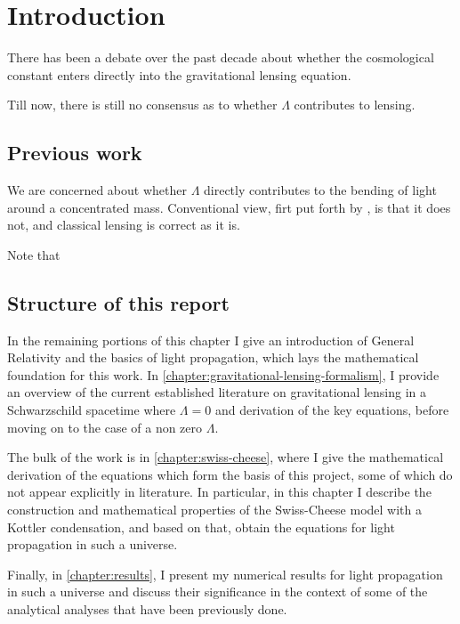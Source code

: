 \chapter{Introduction}

There has been a debate over the past decade about whether the cosmological constant enters directly into the gravitational lensing equation. 

Till now, there is still no consensus as to whether $\Lambda$ contributes to lensing. 

\section{Previous work}

We are concerned about whether $\Lambda$ directly contributes to the bending of light around a concentrated mass. Conventional view, firt put forth by \citet{islam1983cosmological}, is that it does not, and classical lensing is correct as it is. 

Note that 



\section{Structure of this report}
In the remaining portions of this chapter I give an introduction of General Relativity and the basics of light propagation, which lays the mathematical foundation for this work. In \autoref{chapter:gravitational-lensing-formalism}, I provide an overview of the current established literature on gravitational lensing in a Schwarzschild spacetime where $\Lambda = 0$ and derivation of the key equations, before moving on to the case of a non zero $\Lambda$. 

The bulk of the work is in \autoref{chapter:swiss-cheese}, where I give the mathematical derivation of the equations which form the basis of this project, some of which do not appear explicitly in literature. In particular, in this chapter I describe the construction and mathematical properties of the Swiss-Cheese model with a Kottler condensation, and based on that, obtain the equations for light propagation in such a universe. 

Finally, in \autoref{chapter:results}, I present my numerical results for light propagation in such a universe and discuss their significance in the context of some of the analytical analyses that have been previously done. 

